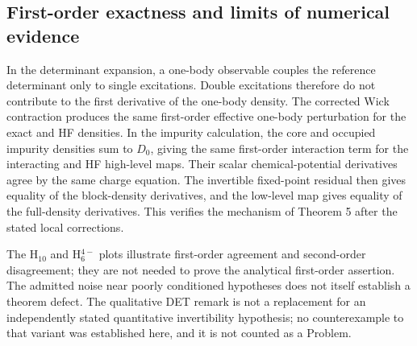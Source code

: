 \documentclass[10pt]{article}
\begin{document}
\subsection*{First-order exactness and limits of numerical evidence}
In the determinant expansion, a one-body observable couples the reference determinant only to single excitations. Double excitations therefore do not contribute to the first derivative of the one-body density. The corrected Wick contraction produces the same first-order effective one-body perturbation for the exact and HF densities. In the impurity calculation, the core and occupied impurity densities sum to \(D_0\), giving the same first-order interaction term for the interacting and HF high-level maps. Their scalar chemical-potential derivatives agree by the same charge equation. The invertible fixed-point residual then gives equality of the block-density derivatives, and the low-level map gives equality of the full-density derivatives. This verifies the mechanism of Theorem 5 after the stated local corrections.\par
The H\(_{10}\) and H\(_6^{4-}\) plots illustrate first-order agreement and second-order disagreement; they are not needed to prove the analytical first-order assertion. The admitted noise near poorly conditioned hypotheses does not itself establish a theorem defect. The qualitative DET remark is not a replacement for an independently stated quantitative invertibility hypothesis; no counterexample to that variant was established here, and it is not counted as a Problem.\par
\end{document}
